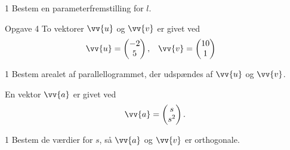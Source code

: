 \begin{delopgave}{}{1}
	Bestem en parameterfremstilling for $l$.
\end{delopgave}
\newpage
\begin{opgavetekst}{Opgave 4}
	To vektorer $\vv{u}$ og $\vv{v}$ er givet ved
	\begin{align*}
		&\vv{u} =
		\begin{pmatrix}
			-2 \\ 5
		\end{pmatrix},
		&& \vv{v} =
		\begin{pmatrix}
			10 \\ 1
		\end{pmatrix}
	\end{align*}
\end{opgavetekst}
\begin{delopgave}{}{1}
	Bestem arealet af parallellogrammet, der udspændes af $\vv{u}$ og $\vv{v}$.
\end{delopgave}
\begin{meretekst}
En vektor $\vv{a}$ er givet ved
\begin{align*}
	\vv{a} =
	\begin{pmatrix}
		s \\ s^2
	\end{pmatrix}.
\end{align*}
\end{meretekst}
\begin{delopgave}{}{1}
	Bestem de værdier for $s$, så $\vv{a}$ og $\vv{v}$ er orthogonale.
\end{delopgave}

